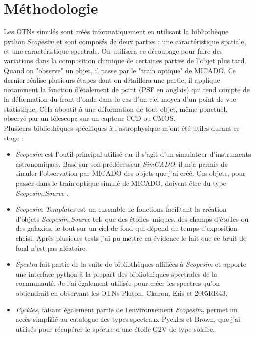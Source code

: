 \documentclass[11pt]{aa}
\begin{document}
\section{Méthodologie}
Les OTNs simulés sont créés informatiquement en utilisant la bibliothèque python \textit{Scopesim} et sont composés de deux parties : une caractéristique spatiale, et une caractéristique spectrale. On utilisera ce découpage pour faire des variations dans la composition chimique de certaines parties de l'objet plus tard. Quand on "observe" un objet, il passe par le "train optique" de MICADO. Ce dernier réalise plusieurs étapes dont on détaillera une partie, il applique notamment la fonction d'étalement de point (PSF en anglais) qui rend compte de la déformation du front d'onde dans le cas d'un ciel moyen d'un point de vue statistique. Cela aboutit à une déformation de tout objet, même ponctuel, observé par un télescope sur un capteur CCD ou CMOS.\\

Plusieurs bibliothèques spécifiques à l'astrophysique m'ont été utiles durant ce stage :
\begin{itemize}
    
    \item[\textbullet] \textit{Scopesim} est l'outil principal utilisé car il s'agit d'un simulateur d'instruments astronomiques. Basé sur son prédécesseur \textit{SimCADO}, il m'a permis de simuler l'observation par MICADO des objets que j'ai créé. Ces objets, pour passer dans le train optique simulé de MICADO, doivent être du type \textit{Scopesim.Source} \citep{scopesim}.
    \item[\textbullet] \textit{Scopesim Templates} est un ensemble de fonctions facilitant la création d'objets \textit{Scopesim.Source} tels que des étoiles uniques, des champs d'étoiles ou des galaxies, le tout sur un ciel de fond qui dépend du temps d'exposition choisi. Après plusieurs tests j'ai pu mettre en évidence le fait que ce bruit de fond n'est pas aléatoire.
    \item[\textbullet] \textit{Spextra} fait partie de la suite de bibliothèques affiliées à \textit{Scopesim} et apporte une interface python à la plupart des bibliothèques spectrales de la communauté. Je l'ai également utilisée pour créer les spectres qu'on obtiendrait en observant les OTNs Pluton, Charon, Eris et 2005RR43.  
    \item[\textbullet] \textit{Pyckles}, faisant également partie de l'environnement \textit{Scopesim}, permet un accès simplifié au catalogue des types spectraux Pyckles et Brown, que j'ai utilisés pour récupérer le spectre d'une étoile G2V de type solaire.
\end{itemize}
\end{document}
